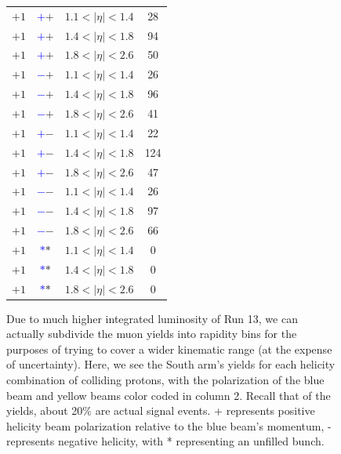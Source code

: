 \begin{figure}
\begin{minipage}[c]{0.67\textwidth}
\begin{tabular}{cccc}
      $+1$ &\textbf{\textcolor{blue}{$+$}\textcolor{ucrgold}{$+$}} & $1.1 <\vert\eta\vert< 1.4$ & 28 \\
      $+1$ &\textbf{\textcolor{blue}{$+$}\textcolor{ucrgold}{$+$}} & $1.4 <\vert\eta\vert< 1.8$ & 94 \\
      $+1$ &\textbf{\textcolor{blue}{$+$}\textcolor{ucrgold}{$+$}} & $1.8 <\vert\eta\vert< 2.6$ & 50 \\
      $+1$ &\textbf{\textcolor{blue}{$-$}\textcolor{ucrgold}{$+$}} & $1.1 <\vert\eta\vert< 1.4$ & 26 \\
      $+1$ &\textbf{\textcolor{blue}{$-$}\textcolor{ucrgold}{$+$}} & $1.4 <\vert\eta\vert< 1.8$ & 96 \\
      $+1$ &\textbf{\textcolor{blue}{$-$}\textcolor{ucrgold}{$+$}} & $1.8 <\vert\eta\vert< 2.6$ & 41 \\
      $+1$ &\textbf{\textcolor{blue}{$+$}\textcolor{ucrgold}{$-$}} & $1.1 <\vert\eta\vert< 1.4$ & 22 \\
      $+1$ &\textbf{\textcolor{blue}{$+$}\textcolor{ucrgold}{$-$}} & $1.4 <\vert\eta\vert< 1.8$ & 124 \\
      $+1$ &\textbf{\textcolor{blue}{$+$}\textcolor{ucrgold}{$-$}} & $1.8 <\vert\eta\vert< 2.6$ & 47 \\
      $+1$ &\textbf{\textcolor{blue}{$-$}\textcolor{ucrgold}{$-$}} & $1.1 <\vert\eta\vert< 1.4$ & 26 \\
      $+1$ &\textbf{\textcolor{blue}{$-$}\textcolor{ucrgold}{$-$}} & $1.4 <\vert\eta\vert< 1.8$ & 97 \\
      $+1$ &\textbf{\textcolor{blue}{$-$}\textcolor{ucrgold}{$-$}} & $1.8 <\vert\eta\vert< 2.6$ & 66 \\
      $+1$ &\textbf{\textcolor{blue}{$*$}\textcolor{ucrgold}{$*$}} & $1.1 <\vert\eta\vert< 1.4$ & 0 \\
      $+1$ &\textbf{\textcolor{blue}{$*$}\textcolor{ucrgold}{$*$}} & $1.4 <\vert\eta\vert< 1.8$ & 0 \\
      $+1$ &\textbf{\textcolor{blue}{$*$}\textcolor{ucrgold}{$*$}} & $1.8 <\vert\eta\vert< 2.6$ & 0 \\
      \bottomrule
    \end{tabular}
  \end{minipage}\hfill
  \begin{minipage}[c]{0.3\textwidth}
    \caption{
      Due to much higher integrated luminosity of Run 13, we can actually
      subdivide the muon yields into rapidity bins for the purposes of trying to
      cover a wider kinematic range (at the expense of uncertainty). Here, we see
      the South arm's yields for each helicity combination of colliding protons,
      with the polarization of the blue beam and yellow beams color coded in
      column 2. Recall that of the yields, about 20\% are actual signal events.
      + represents positive helicity beam polarization relative to the blue
      beam's momentum, - represents negative helicity, with * representing an
      unfilled bunch.
    }
    \label{tab:south_sorted_muons_eta_bins}
  \end{minipage}
\end{figure}


